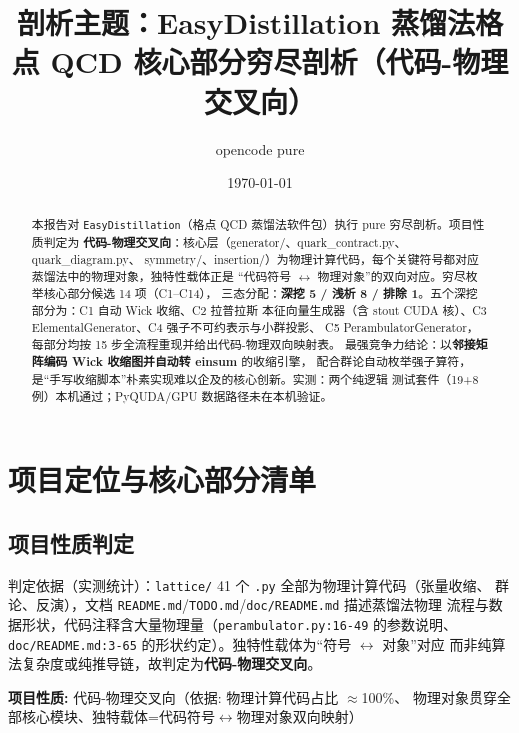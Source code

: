 \documentclass[UTF8]{ctexart}
\title{剖析主题：EasyDistillation 蒸馏法格点 QCD 核心部分穷尽剖析（代码-物理交叉向）}
\author{opencode pure}
\date{\today}
\begin{document}
\maketitle

\begin{abstract}
本报告对 \texttt{EasyDistillation}（格点 QCD 蒸馏法软件包）执行 pure 穷尽剖析。项目性质判定为
\textbf{代码-物理交叉向}：核心层（generator/、quark\_contract.py、quark\_diagram.py、
symmetry/、insertion/）为物理计算代码，每个关键符号都对应蒸馏法中的物理对象，独特性载体正是
``代码符号 $\leftrightarrow$ 物理对象''的双向对应。穷尽枚举核心部分候选 14 项（C1--C14），
三态分配：\textbf{深挖 5 / 浅析 8 / 排除 1}。五个深挖部分为：C1 自动 Wick 收缩、C2 拉普拉斯
本征向量生成器（含 stout CUDA 核）、C3 ElementalGenerator、C4 强子不可约表示与小群投影、
C5 PerambulatorGenerator，每部分均按 15 步全流程重现并给出代码-物理双向映射表。
最强竞争力结论：以\textbf{邻接矩阵编码 Wick 收缩图并自动转 einsum} 的收缩引擎，
配合群论自动枚举强子算符，是``手写收缩脚本''朴素实现难以企及的核心创新。实测：两个纯逻辑
测试套件（19+8 例）本机通过；PyQUDA/GPU 数据路径未在本机验证。
\end{abstract}

\tableofcontents

\section{项目定位与核心部分清单}

\subsection{项目性质判定}
判定依据（实测统计）：\texttt{\nolinkurl{lattice/}} 41 个 \texttt{\nolinkurl{.py}} 全部为物理计算代码（张量收缩、
群论、反演），文档 \texttt{\nolinkurl{README.md}}/\texttt{\nolinkurl{TODO.md}}/\texttt{\nolinkurl{doc/README.md}} 描述蒸馏法物理
流程与数据形状，代码注释含大量物理量（\texttt{\nolinkurl{perambulator.py:16-49}} 的参数说明、
\texttt{\nolinkurl{doc/README.md:3-65}} 的形状约定）。独特性载体为``符号 $\leftrightarrow$ 对象''对应
而非纯算法复杂度或纯推导链，故判定为\textbf{代码-物理交叉向}。

\begin{keybox}
\textbf{项目性质:} \textcolor{phys}{代码-物理交叉向}（依据: 物理计算代码占比 $\approx$100\%、
物理对象贯穿全部核心模块、独特载体=代码符号$\leftrightarrow$物理对象双向映射）
\end{keybox}
\end{document}
